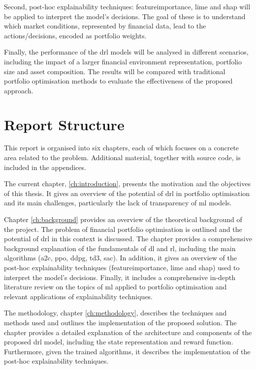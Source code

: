 Second, post-hoc explainability techniques: \Gls{featureimportance}, \acrfull{lime} and \acrfull{shap} will be applied to interpret the model's decisions. The goal of these is to understand which market conditions, represented by financial data, lead to the actions/decisions, encoded as portfolio weights. 

Finally, the performance of the \acrshort{drl} models will be analysed in different scenarios, including the impact of a larger financial environment representation, portfolio size and asset composition. The results will be compared with traditional portfolio optimisation methods to evaluate the effectiveness of the proposed approach.

\section{Report Structure} \label{sec:introduction-structure}

This report is organised into six chapters, each of which focuses on a concrete area related to the problem. Additional material, together with source code, is included in the appendices. 

The current chapter, \ref{ch:introduction}, presents the motivation and the objectives of this thesis. It gives an overview of the potential of \acrshort{drl} in portfolio optimisation and its main challenges, particularly the lack of transparency of \acrshort{ml} models. 

Chapter \ref{ch:background} provides an overview of the theoretical background of the project. The problem of financial portfolio optimisation is outlined and the potential of \acrshort{drl} in this context is discussed. The chapter provides a comprehensive background explanation of the fundamentals of \acrlong{dl} and \acrlong{rl}, including the main algorithms (\acrshort{a2c}, \acrshort{ppo}, \acrshort{ddpg}, \acrshort{td3}, \acrshort{sac}). In addition, it gives an overview of the post-hoc explainability techniques (\Gls{featureimportance}, \acrshort{lime} and \acrshort{shap}) used to interpret the model's decisions. Finally, it includes a comprehensive in-depth literature review on the topics of \acrshort{ml} applied to portfolio optimisation and relevant applications of explainability techniques. 

The methodology, chapter \ref{ch:methodology}, describes the techniques and methods used and outlines the implementation of the proposed solution. The chapter provides a detailed explanation of the architecture and components of the proposed \acrshort{drl} model, including the state representation and reward function. Furthermore, given the trained algorithms, it describes the implementation of the post-hoc explainability techniques.

